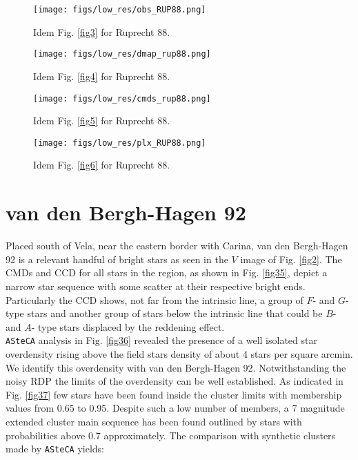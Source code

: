 \documentclass{aa}
\begin{document}
\begin{figure*}[ht]
    \centering
    \texttt{[image: figs/low\_res/obs\_RUP88.png]}
    \caption{Idem Fig. \ref{fig3} for Ruprecht 88.}
    \label{fig31}
\end{figure*}
\begin{figure*}[ht]
    \centering
    \texttt{[image: figs/low\_res/dmap\_rup88.png]}
    \caption{Idem Fig. \ref{fig4} for Ruprecht 88.}
    \label{fig32}
\end{figure*}
\begin{figure*}[ht]
    \centering
    \texttt{[image: figs/low\_res/cmds\_rup88.png]}
    \caption{Idem Fig. \ref{fig5} for Ruprecht 88.}
    \label{fig33}
\end{figure*}
\begin{figure*}[ht]
    \centering
    \texttt{[image: figs/low\_res/plx\_RUP88.png]}
    \caption{Idem Fig. \ref{fig6} for Ruprecht 88.}
    \label{fig34}
\end{figure*}




\section{van den Bergh-Hagen 92}

Placed south of Vela, near the eastern border with Carina, van den Bergh-Hagen
92 is a relevant handful of bright stars as seen in the $V$ image of Fig.
\ref{fig2}. The CMDs and CCD for all stars in the region, as shown in Fig.
\ref{fig35}, depict a narrow star sequence with some scatter at their respective
bright ends. Particularly the CCD shows, not far from the intrinsic line, a
group of $F$- and $G$-type stars and another group of stars below the intrinsic
line that could be $B$- and $A$- type stars displaced by the reddening effect.\\

\texttt{ASteCA} analysis in Fig. \ref{fig36} revealed the presence of a well
isolated star overdensity rising above the field stars density of about 4
stars per square arcmin. We identify this overdensity with van den Bergh-Hagen
92. Notwithstanding the noisy RDP the limits of the overdensity can be well
established. As indicated in Fig. \ref{fig37} few stars have been found inside
the cluster limits with membership values from 0.65 to 0.95. Despite such a low
number of members, a 7 magnitude extended cluster main sequence has been found
outlined by stars with probabilities above 0.7 approximately. The comparison
with synthetic clusters made by \texttt{ASteCA} yields:
\end{document}
